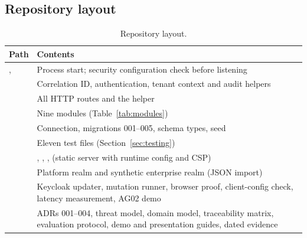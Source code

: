 \subsection{Repository layout}
\begin{table}[H]
\centering
\small
\begin{tabularx}{\textwidth}{@{}P{5.2cm} L@{}}
\toprule
\textbf{Path} & \textbf{Contents}\\
\midrule
{},  & Process start; security configuration check before listening\\
 & Correlation ID, authentication, tenant context and audit helpers\\
 & All HTTP routes and the  helper\\
 & Nine modules (Table~\ref{tab:modules})\\
 & Connection, migrations 001--005, schema types, seed\\
 & Eleven test files (Section~\ref{sec:testing})\\
 & , , ,  (static server with runtime config and CSP)\\
 & Platform realm and synthetic enterprise realm (JSON import)\\
 & Keycloak updater, mutation runner, browser proof, client-config check, latency measurement, AG02 demo\\
 & ADRs 001--004, threat model, domain model, traceability matrix, evaluation protocol, demo and presentation guides, dated evidence\\
\bottomrule
\end{tabularx}
\caption{Repository layout.}
\end{table}

